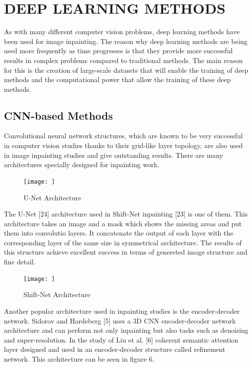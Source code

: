 \chapter{DEEP LEARNING METHODS}\label{deep_methods}

As with many different computer vision problems, deep learning methods have been used for image inpainting.
The reason why deep learning methods are being used more frequently as time progresses is that they provide more successful results in complex problems compared to traditional methods. The main reason for this is the creation of large-scale datasets that will enable the training of deep methods and the computational power that allow the training of these deep methods.

\section{CNN-based Methods}

Convolutional neural network structures, which are known to be very successful in computer vision studies thanks to their grid-like layer topology, are also used in image inpainting studies and give outstanding results. There are many architectures specially designed for inpainting work.

\begin{figure}[h]
    \centering
    \texttt{[image: ]}
    \caption{U-Net Architecture}
    \label{fig:my_label}
\end{figure}

The U-Net [24] architecture used in Shift-Net inpainting [23] is one of them. This architecture takes an image and a mask which shows the missing areas and put them into convolutio layers. It concatenate the output of each layer with the corresponding layer of the same size in symmetrical architecture. The results of this structure achieve excellent success in terms of genereted image structure and fine detail.

\begin{figure}[h]
    \centering
    \texttt{[image: ]}
    \caption{Shift-Net Architecture}
    \label{fig:my_label}
\end{figure}

Another popular architecture used in inpainting studies is the encoder-decoder network. Sidorov and Hardeberg [5] uses a 3D CNN encoder-decoder network architecture and can perform not only inpainting but also tasks such as denoising and super-resolution. In the study of Liu et al. [6] coherent semantic attention layer designed and used in an encoder-decoder structure called refinement network. This architecture can be seen in figure 6.

